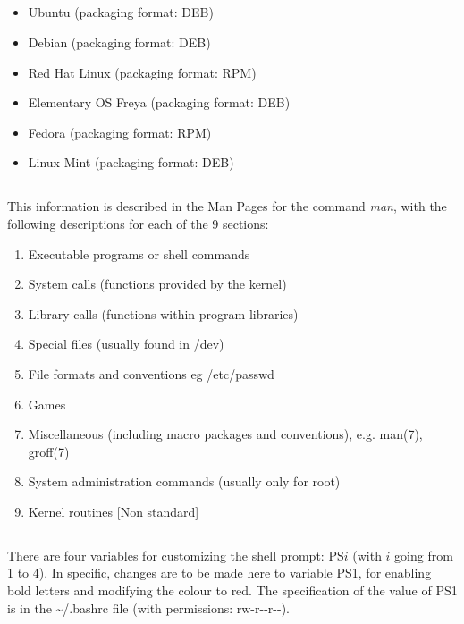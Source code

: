 \documentclass[paper=a4, fontsize=11pt]{scrartcl} %
\numberwithin{equation}{section} %
\numberwithin{figure}{section} %
\numberwithin{table}{section} %
\begin{document}
\begin{onehalfspacing}

\subsection{\textbf{}}

\begin{itemize}
\item Ubuntu (packaging format: DEB)
\item Debian (packaging format: DEB)
\item Red Hat Linux (packaging format: RPM)
\item Elementary OS Freya (packaging format: DEB)
\item Fedora (packaging format: RPM)
\item Linux Mint (packaging format: DEB)
\end{itemize}

\subsection{\textbf{}}

This information is described in the Man Pages for the command \textit{man}, with the following descriptions for each of the 9 sections:

\begin{enumerate}
\item Executable programs or shell commands
\item System calls (functions provided by the kernel)
\item Library calls (functions within program libraries)
\item Special files (usually found in /dev)
\item File formats and conventions eg /etc/passwd
\item Games
\item Miscellaneous  (including  macro  packages  and  conventions), e.g. man(7), groff(7)
\item System administration commands (usually only for root)
\item Kernel routines [Non standard]
\end{enumerate}

\subsection{\textbf{}}

There are four variables for customizing the shell prompt: PS$i$ (with $i$ going from 1 to 4). In specific, changes are to be made here to variable PS1, for enabling bold letters and modifying the colour to red. The specification of the value of PS1 is in the \textasciitilde/.bashrc file (with permissions: rw-r-{}-r-{}-).


\end{onehalfspacing}
\end{document}
